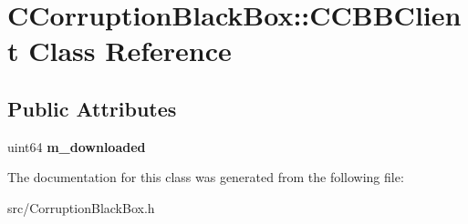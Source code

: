 \section{CCorruptionBlackBox::CCBBClient Class Reference}
\label{classCCorruptionBlackBox_1_1CCBBClient}
\subsection*{Public Attributes}
\begin{DoxyCompactItemize}
\item 
uint64 {\bfseries m\_\-downloaded}\label{classCCorruptionBlackBox_1_1CCBBClient_a76a079bb7136c94efad0ad7bd14c7156}

\end{DoxyCompactItemize}


The documentation for this class was generated from the following file:\begin{DoxyCompactItemize}
\item 
src/CorruptionBlackBox.h\end{DoxyCompactItemize}

